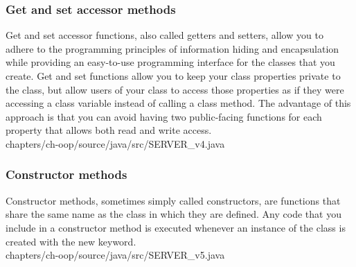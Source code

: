 	\subsubsection{Get and set accessor methods}
	Get and set accessor functions, also called getters 
	and setters, allow you to adhere to the programming principles of 
	information hiding and encapsulation while providing an 
	easy-to-use programming interface for the classes that you 
	create. Get and set functions allow you to keep your class 
	properties private to the class, but allow users of your class 
	to access those properties as if they were accessing a 
	class variable instead of calling a class method. 
	The advantage of this approach is that you can avoid 
	having two public-facing functions for each property 
	that allows both read and write access. \\

		
		{chapters/ch-oop/source/java/src/SERVER_v4.java}
	
	
	\subsubsection{Constructor methods}
	Constructor methods, sometimes simply called constructors, 
	are functions that share the same name as the class in 
	which they are defined. Any code that you include in 
	a constructor method is executed whenever an instance of the 
	class is created with the  new  keyword. \\

		 {chapters/ch-oop/source/java/src/SERVER_v5.java}

	
